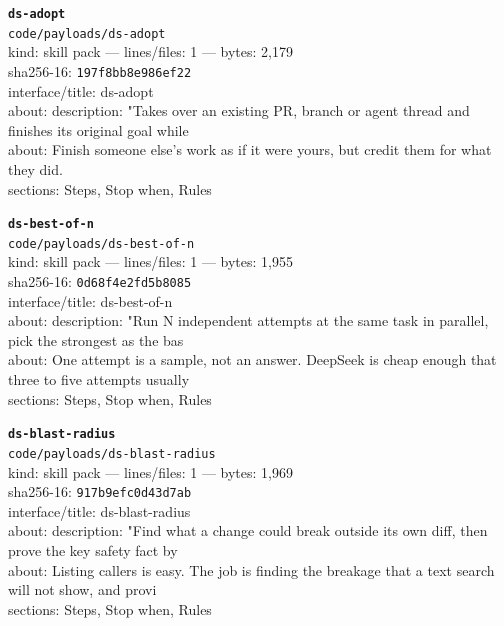 \noindent\textbf{\texttt{ds-adopt}}\\
\texttt{code/payloads/ds-adopt}\\
kind: skill pack --- lines/files: 1 --- bytes: 2,179\\
sha256-16: \texttt{197f8bb8e986ef22}\\
interface/title: ds-adopt\\
about: description: "Takes over an existing PR, branch or agent thread and finishes its original goal while\\
about: Finish someone else's work as if it were yours, but credit them for what they did.\\
sections: Steps, Stop when, Rules\\
\vspace*{6.0pt}

\noindent\textbf{\texttt{ds-best-of-n}}\\
\texttt{code/payloads/ds-best-of-n}\\
kind: skill pack --- lines/files: 1 --- bytes: 1,955\\
sha256-16: \texttt{0d68f4e2fd5b8085}\\
interface/title: ds-best-of-n\\
about: description: "Run N independent attempts at the same task in parallel, pick the strongest as the bas\\
about: One attempt is a sample, not an answer. DeepSeek is cheap enough that three to five attempts usually\\
sections: Steps, Stop when, Rules\\
\vspace*{6.0pt}
\newpage

\noindent\textbf{\texttt{ds-blast-radius}}\\
\texttt{code/payloads/ds-blast-radius}\\
kind: skill pack --- lines/files: 1 --- bytes: 1,969\\
sha256-16: \texttt{917b9efc0d43d7ab}\\
interface/title: ds-blast-radius\\
about: description: "Find what a change could break outside its own diff, then prove the key safety fact by\\
about: Listing callers is easy. The job is finding the breakage that a text search will not show, and provi\\
sections: Steps, Stop when, Rules\\
\vspace*{6.0pt}

